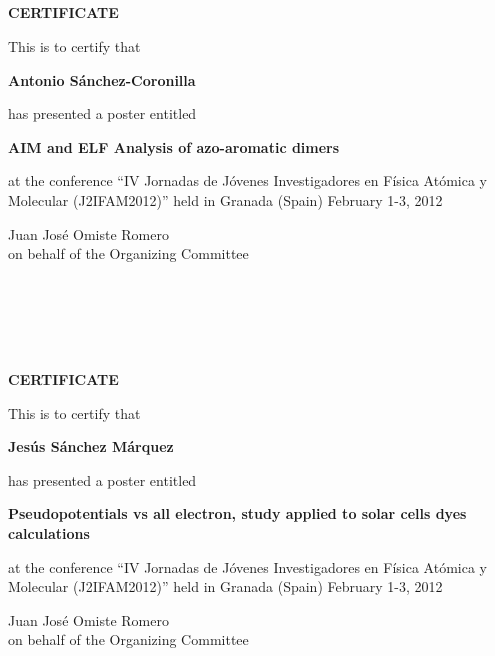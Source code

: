 \documentclass [13pt,a4paper] {letter}
\begin{document}
\begin{verbatim}





\end{verbatim}
\pagestyle{empty}
\begin{center}
{\bf {\Huge CERTIFICATE}}

\vspace {1.5cm}
This is to certify that
\vspace {1cm}

{\bf \Large  Antonio    Sánchez-Coronilla }
\vspace {1cm}

has presented a poster entitled
\vspace {1cm}

{\bf \large  AIM and ELF Analysis of azo-aromatic dimers  }
\vspace {1cm}

at the conference { \textquotedblleft IV Jornadas de Jóvenes Investigadores en Física Atómica y Molecular (J2IFAM2012)\textquotedblright} 
held in Granada (Spain) February 1-3, 2012
\end{center}
\vspace {3cm}
\begin{raggedleft}
Juan José Omiste Romero \\
on behalf of the Organizing Committee
\newpage
\end{raggedleft}
\begin{verbatim}





\end{verbatim}
\pagestyle{empty}
\begin{center}
{\bf {\Huge CERTIFICATE}}

\vspace {1.5cm}
This is to certify that
\vspace {1cm}

{\bf \Large  Jesús  Sánchez  Márquez }
\vspace {1cm}

has presented a poster entitled
\vspace {1cm}

{\bf \large  Pseudopotentials vs all electron, study applied to solar cells dyes calculations  }
\vspace {1cm}

at the conference { \textquotedblleft IV Jornadas de Jóvenes Investigadores en Física Atómica y Molecular (J2IFAM2012)\textquotedblright} 
held in Granada (Spain) February 1-3, 2012
\end{center}
\vspace {3cm}
\begin{raggedleft}
Juan José Omiste Romero \\
on behalf of the Organizing Committee
\newpage
\end{raggedleft}
\begin{verbatim}





\end{verbatim}
\end{document}
